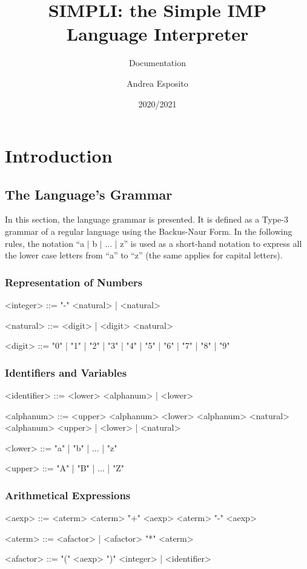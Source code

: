 \documentclass{esposito-documentation}
\title{SIMPLI: the Simple IMP Language Interpreter}
\subtitle{Documentation}
\author{Andrea Esposito}
\date{2020/2021}
\begin{document}
\frontmatter
\maketitle
\colophon
\tableofcontents

\mainmatter
\chapter{Introduction}

\section{The Language's Grammar}

In this section, the language grammar is presented. It is defined as a Type-3
grammar of a regular language using the Backus-Naur Form. In the following
rules, the notation ``a $\mid$ b $\mid$ ... $\mid$ z'' is used as a short-hand
notation to express all the lower case letters from ``a'' to ``z'' (the same
applies for capital letters).

\subsection{Representation of Numbers}
\begin{grammar}
	<integer> ::= "-" <natural> | <natural>

	<natural> ::= <digit> | <digit> <natural>

	<digit> ::= "0" | "1" | "2" | "3" | "4" | "5" | "6" | "7" | "8" | "9"
\end{grammar}

\subsection{Identifiers and Variables}
\begin{grammar}
	<identifier> ::= <lower> <alphanum> | <lower> 
	
	<alphanum> ::= <upper> <alphanum>
	\alt <lower> <alphanum>
	\alt <natural> <alphanum>
	\alt<upper> | <lower> | <natural>

	<lower> ::= "a" | "b" | ... | "z"

	<upper> ::= "A" | "B" | ... | "Z"
\end{grammar}

\subsection{Arithmetical Expressions}
\begin{grammar}
	<aexp> ::= <aterm>
	\alt <aterm> "+" <aexp>
	\alt <aterm> "-" <aexp>

	<aterm> ::= <afactor> | <afactor> "*" <aterm>

	<afactor> ::= "(" <aexp> ")"
	\alt <integer> | <identifier>
\end{grammar}
\end{document}

